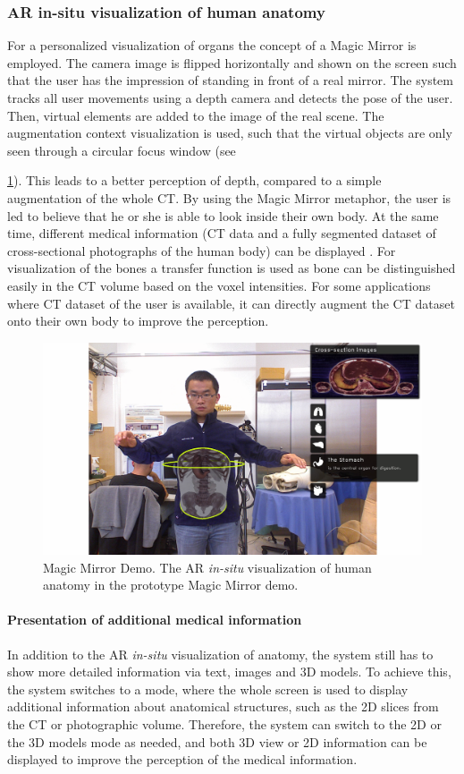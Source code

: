 {\subsubsection{AR in-situ visualization of human anatomy}
For a personalized visualization of organs the concept of a Magic Mirror is employed. The camera image is flipped horizontally and shown on the screen such that the user has the impression of standing in front of a real mirror. The system tracks all user movements using a depth camera and detects the pose of the user. Then, virtual elements are added to the image of the real scene. The augmentation context visualization \cite{Bichlmeier2007} is used, such that the virtual objects are only seen through a circular focus window (see \figurename{\ref{fig:3-MMC:Mirracle}). This leads to a better perception of depth, compared to a simple augmentation of the whole CT. 
By using the Magic Mirror metaphor, the user is led to believe that he or she is able to look inside their own body. At the same time, different medical information (CT data and a fully segmented dataset of cross-sectional photographs of the human body) can be displayed \cite{Blum2012}. For visualization of the bones a transfer function is used as bone can be distinguished easily in the CT volume based on the voxel intensities. For some applications where CT dataset of the user is available, it can directly augment the CT dataset onto their own body to improve the perception.
\begin{figure}
	\centering
	\includegraphics[width=0.9\linewidth]{figures/3-MMC/Mirracle}
	\caption{Magic Mirror Demo. The AR \textit{in-situ} visualization of human anatomy in the prototype Magic Mirror demo.}
	\label{fig:3-MMC:Mirracle}
\end{figure}

\paragraph{Presentation of additional medical information}
In addition to the AR \textit{in-situ} visualization of anatomy, the system still has to show more detailed information via text, images and 3D models. To achieve this, the system switches to a mode, where the whole screen is used to display additional information about anatomical structures, such as the 2D slices from the CT or photographic volume.
Therefore, the system can switch to the 2D or the 3D models mode as needed, and both 3D view or 2D information can be displayed to improve the perception of the medical information.

}}
